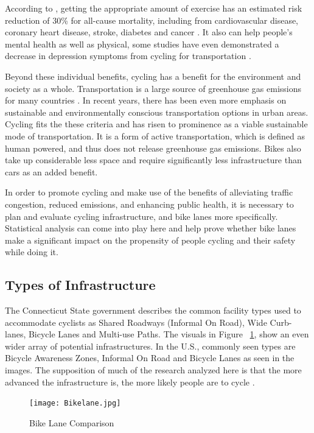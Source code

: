 \documentclass[12pt, letterpaper]{article}
\begin{document}
According to \citet{Gtschi2015}, getting the appropriate amount of exercise has an estimated risk reduction of 30\% for all-cause mortality, including from cardiovascular disease, coronary heart disease, stroke, diabetes and cancer . It also can help people's mental health as well as physical, some studies have even demonstrated a decrease in depression symptoms from cycling for transportation \cite{Green2021}. \par
Beyond these individual benefits, cycling has a benefit for the environment and society as a whole. Transportation is a large source of greenhouse gas emissions for many countries \cite{Green2021}. In recent years, there has been even more emphasis on sustainable and environmentally conscious transportation options in urban areas. Cycling fits the these criteria and has risen to prominence as a viable sustainable mode of transportation. It is a form of active transportation, which is defined as human powered, and thus does not release greenhouse gas emissions. Bikes also take up considerable less space and require significantly less infrastructure than cars as an added benefit.\par 
In order to promote cycling and make use of the benefits of alleviating traffic congestion, reduced emissions, and enhancing public health, it is necessary to plan and evaluate cycling infrastructure, and bike lanes more specifically. Statistical analysis can come into play here and help prove whether bike lanes make a significant impact on the propensity of people cycling and their safety while doing it. 

\subsection{Types of Infrastructure}
\label{sec:bikeshare}

The Connecticut State government describes the common facility types used to accommodate cyclists as Shared Roadways (Informal On Road), Wide Curb-lanes, Bicycle Lanes and Multi-use Paths. The visuals in Figure ~\ref{fig:bikelane}, show an even wider array of potential infrastructures. In the U.S., commonly seen types are Bicycle Awareness Zones, Informal On Road and Bicycle Lanes as seen in the images. The supposition of much of the research analyzed here is that the more advanced the infrastructure is, the more likely people are to cycle \cite{1MateoBabiano2016}.\par 

\begin{figure}[hbt!]
    \centering
    \texttt{[image: Bikelane.jpg]}
    \caption{Bike Lane Comparison \cite{1MateoBabiano2016}}
    \label{fig:bikelane}
\end{figure}
\end{document}
